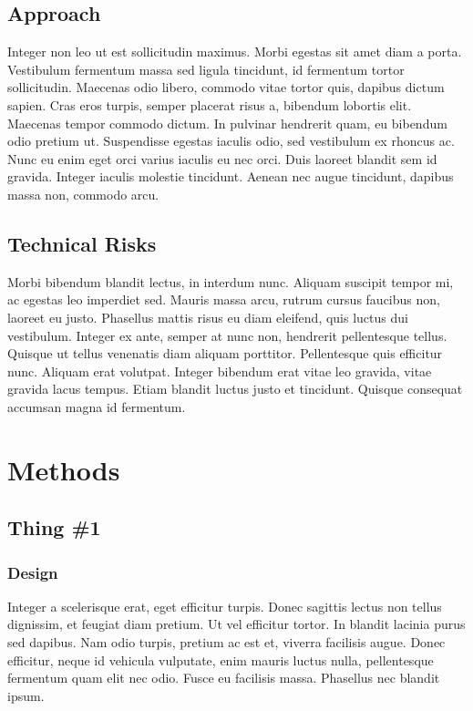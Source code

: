 \section{Approach}
Integer non leo ut est sollicitudin maximus. Morbi egestas sit amet diam a porta. Vestibulum fermentum massa sed ligula tincidunt, id fermentum tortor sollicitudin. Maecenas odio libero, commodo vitae tortor quis, dapibus dictum sapien. Cras eros turpis, semper placerat risus a, bibendum lobortis elit. Maecenas tempor commodo dictum. In pulvinar hendrerit quam, eu bibendum odio pretium ut. Suspendisse egestas iaculis odio, sed vestibulum ex rhoncus ac. Nunc eu enim eget orci varius iaculis eu nec orci. Duis laoreet blandit sem id gravida. Integer iaculis molestie tincidunt. Aenean nec augue tincidunt, dapibus massa non, commodo arcu.

\section{Technical Risks}
Morbi bibendum blandit lectus, in interdum nunc. Aliquam suscipit tempor mi, ac egestas leo imperdiet sed. Mauris massa arcu, rutrum cursus faucibus non, laoreet eu justo. Phasellus mattis risus eu diam eleifend, quis luctus dui vestibulum. Integer ex ante, semper at nunc non, hendrerit pellentesque tellus. Quisque ut tellus venenatis diam aliquam porttitor. Pellentesque quis efficitur nunc. Aliquam erat volutpat. Integer bibendum erat vitae leo gravida, vitae gravida lacus tempus. Etiam blandit luctus justo et tincidunt. Quisque consequat accumsan magna id fermentum.


\chapter{Methods}

\section{Thing \#1}

\subsection{Design}
Integer a scelerisque erat, eget efficitur turpis. Donec sagittis lectus non tellus dignissim, et feugiat diam pretium. Ut vel efficitur tortor. In blandit lacinia purus sed dapibus. Nam odio turpis, pretium ac est et, viverra facilisis augue. Donec efficitur, neque id vehicula vulputate, enim mauris luctus nulla, pellentesque fermentum quam elit nec odio. Fusce eu facilisis massa. Phasellus nec blandit ipsum.

